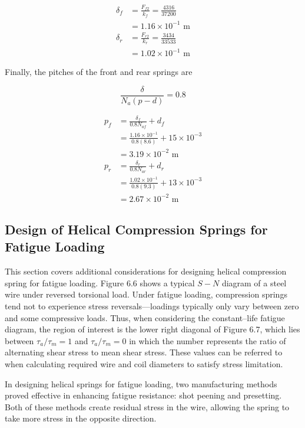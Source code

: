 \documentclass[a4paper,openany,12pt]{book}
\begin{document}
{{$$\begin{aligned}
    \delta_f &= \frac{F_{f2}}{k_f} = \frac{4316}{37200} \\
             &= 1.16 \times 10^{-1} \text{ m} \\
    \delta_r &= \frac{F_{r2}}{k_r} = \frac{3434}{33533} \\
             &= 1.02 \times 10^{-1} \text{ m}
  \end{aligned}$$

Finally, the pitches of the front and rear springs are

$$\frac{\delta}{N_a(p - d)} = 0.8$$

$$\begin{aligned}
    p_f &= \frac{\delta_f}{0.8N_{af}} + d_f \\ 
          &= \frac{1.16 \times 10^{-1}}{0.8(8.6)} + 15 \times 10^{-3} \\ 
          &= 3.19 \times 10^{-2} \text{ m} \\
    p_r &= \frac{\delta_r}{0.8N_{ar}} + d_r \\ 
          &= \frac{1.02 \times 10^{-1}}{0.8(9.3)} + 13 \times 10^{-3} \\ 
          &= 2.67 \times 10^{-2} \text{ m}
  \end{aligned}$$

\subsection{Design of Helical Compression Springs for Fatigue Loading}
\label{design-of-helical-compression-springs-for-fatigue-loading}
This section covers additional considerations for designing helical
compression spring for fatigue loading. Figure 6.6 shows a typical \(S-N\)
diagram of a steel wire under reversed torsional load. Under fatigue
loading, compression springs tend not to experience stress
reversals---loadings typically only vary between zero and some
compressive loads. Thus, when considering the constant--life fatigue
diagram, the region of interest is the lower right diagonal of Figure
6.7, which lies between \(\tau_a / \tau_m = 1\) and \(\tau_a / \tau_m = 0\)
in which the number represents the ratio of alternating shear stress to
mean shear stress. These values can be referred to when calculating
required wire and coil diameters to satisfy stress limitation.

In designing helical springs for fatigue loading, two manufacturing
methods proved effective in enhancing fatigue resistance: shot peening
and presetting. Both of these methods create residual stress in the
wire, allowing the spring to take more stress in the opposite direction.

}}
\end{document}

